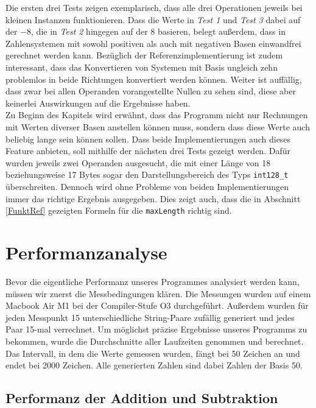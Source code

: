 \documentclass[course=erap]{aspdoc}
\begin{document}
    Die ersten drei Tests zeigen exemplarisch, dass alle drei Operationen jeweils bei kleinen Instanzen funktionieren. Dass die Werte in
    \textit{Test 1} und \textit{Test 3} dabei auf der $-8$, die in \textit{Test 2} hingegen auf der $8$ basieren, belegt außerdem, dass in
    Zahlensystemen mit sowohl positiven als auch mit negativen Basen einwandfrei gerechnet werden kann. Bezüglich der Referenzimplementierung
    ist zudem interessant, dass das Konvertieren von Systemen mit Basis ungleich zehn problemlos in beide Richtungen konvertiert werden
    können. Weiter ist auffällig, dass zwar bei allen Operanden vorangestellte Nullen zu sehen sind, diese aber keinerlei Auswirkungen auf die
    Ergebnisse haben.\\
    \newline
    Zu Beginn des Kapitels wird erwähnt, dass das Programm nicht nur Rechnungen mit Werten diverser Basen anstellen können muss, sondern dass
    diese Werte auch beliebig lange sein können sollen. Dass beide Implementierungen auch dieses Feature anbieten,
    soll mithilfe der nächsten drei Tests gezeigt werden. Dafür wurden jeweils zwei Operanden ausgesucht, die mit einer Länge von 18
    beziehungsweise 17 Bytes sogar den Darstellungsbereich des Typs \verb+int128_t+ überschreiten. Dennoch wird ohne Probleme von beiden
    Implementierungen immer das richtige Ergebnis ausgegeben. Dies zeigt auch, dass die in Abschnitt \ref{FunktRef} gezeigten Formeln für die
    \verb+maxLength+ richtig sind.


    \section{Performanzanalyse}

    Bevor die eigentliche Performanz unseres Programmes analysiert werden kann, müssen wir zuerst die Messbedingungen klären. Die Messungen wurden
    auf einem Macbook Air M1 bei der Compiler-Stufe O3 durchgeführt. Außerdem wurden für jeden Messpunkt 15 unterschiedliche String-Paare
    zufällig generiert und jedes Paar 15-mal verrechnet. Um möglichst präzise Ergebnisse unseres Programms zu bekommen, wurde die Durchschnitte
    aller Laufzeiten genommen und berechnet. Das Intervall, in dem die Werte gemessen wurden, fängt bei 50 Zeichen an
    und endet bei 2000 Zeichen. Alle generierten Zahlen sind dabei Zahlen der Basis 50. \\

    \subsection{Performanz der Addition und Subtraktion}
\end{document}
